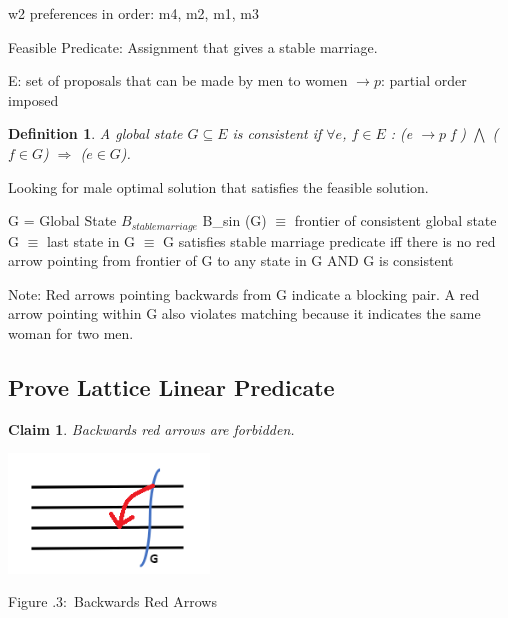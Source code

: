 \documentclass[twoside]{article}
\newcounter{lecnum}
\newcommand{\fig}[3]{
			\vspace{#2}
			\begin{center}
			Figure \thelecnum.#1:~#3
			\end{center}
	}
\newtheorem{claim}[theorem]{Claim}
\newtheorem{definition}[theorem]{Definition}
\begin{document}
w2 preferences in order: m4, m2, m1, m3 \newline

Feasible Predicate: Assignment that gives a stable marriage. \newline

E: set of proposals that can be made by men to women \newline
$ \rightarrow p$: partial order imposed

\begin{definition}
A global state $G \subseteq E$ is consistent if \newline
 \hspace*{10mm}$\forall e$, $f \in  E$ : (e $ \rightarrow p$  f )  $ \bigwedge $  ($f \in  G$) $ \Longrightarrow $ ($e \in G$).
\end{definition}

Looking for male optimal solution that satisfies the feasible solution.

\newline
G = Global State \newline
$B_{stable marriage}$ \equiv B_{sin} (G) \newline
\hspace*{23mm} $\equiv $ frontier of consistent global state G \newline
\hspace*{22mm} $\equiv $ last state in G \newline
\hspace*{22mm} $\equiv $ G satisfies stable marriage predicate iff there is no red arrow pointing from frontier of G to \newline
\hspace*{24mm} any state in G AND G is consistent \newline

Note: Red arrows pointing backwards from G indicate a blocking pair. A red arrow pointing within G also violates matching because it indicates the same woman for two men.

\subsection{Prove Lattice Linear Predicate}
\begin{claim}
Backwards red arrows are forbidden. \newline
\end{claim}

\begin{center}
\includegraphics[width=0.4\textwidth]{figure_3_lines_w_G_and_arrow.PNG}
\end{center}
\fig{3}{4}{Backwards Red Arrows}
 
\end{document}
